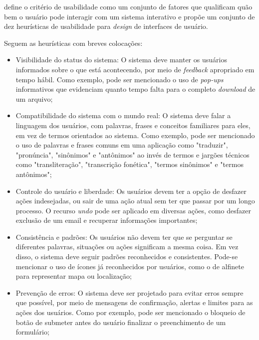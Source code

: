  define o critério de usabilidade como um conjunto de fatores que qualificam 
quão bem o usuário pode interagir com um sistema interativo e propõe um conjunto de dez 
heurísticas de usabilidade para \textit{design} de interfaces de usuário.

\begin{description}
  \item Seguem as heurísticas com breves colocações:
        \begin{itemize}
            \item Visibilidade do status do sistema: O sistema deve manter os usuários informados sobre o que está 
            acontecendo, por meio de \textit{feedback} apropriado em tempo hábil. Como exemplo, pode ser mencionado 
            o uso de \textit{pop-ups} informativos que evidenciam quanto tempo falta para o completo \textit{download} de um arquivo;

            \item Compatibilidade do sistema com o mundo real: O sistema deve falar a linguagem dos usuários, com 
            palavras, frases e conceitos familiares para eles, em vez de termos orientados ao sistema. Como exemplo, pode ser 
            mencionado o uso de palavras e frases comuns em uma aplicação como "traduzir", "pronúncia", "sinônimos" e "antônimos" 
            ao invés de termos e jargões técnicos como "transliteração", "transcrição fonética", "termos sinônimos" e "termos antônimos";

            \item Controle do usuário e liberdade: Os usuários devem ter a opção de desfazer ações indesejadas, ou sair 
            de uma ação atual sem ter que passar por um longo processo. O recurso \textit{undo} pode ser aplicado em diversas ações, como 
            desfazer exclusão de um email e recuperar informações importantes;

            \item Consistência e padrões: Os usuários não devem ter que se perguntar se diferentes palavras, situações 
            ou ações significam a mesma coisa. Em vez disso, o sistema deve seguir padrões reconhecidos e consistentes. Pode-se mencionar o uso 
            de ícones já reconhecidos por usuários, como o de alfinete para representar mapa ou localização;

            \item Prevenção de erros: O sistema deve ser projetado para evitar erros sempre que possível, por meio de 
            mensagens de confirmação, alertas e limites para as ações dos usuários. Como por exemplo, pode ser mencionado 
            o bloqueio de botão de submeter antes do usuário finalizar o preenchimento de um formulário;
            

\end{itemize}
\end{description}
